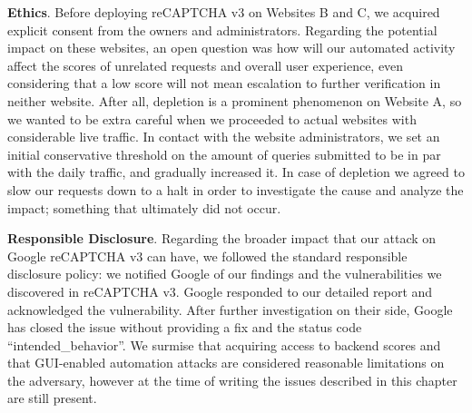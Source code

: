 \textbf{Ethics}.
Before deploying reCAPTCHA v3 on Websites B and C, we acquired explicit consent from the owners and administrators.
Regarding the potential impact on these websites, an open question was how will our automated activity affect the scores of unrelated requests and overall user experience, even considering that a low score will not mean escalation to further verification in neither website.
After all, depletion is a prominent phenomenon on Website A, so we wanted to be extra careful when we proceeded to actual websites with considerable live traffic.
In contact with the website administrators, we set an initial conservative threshold on the amount of queries submitted to be in par with the daily traffic, and gradually increased it.
In case of depletion we agreed to slow our requests down to a halt in order to investigate the cause and analyze the impact; something that ultimately did not occur.


\textbf{Responsible Disclosure}.
Regarding the broader impact that our attack on Google reCAPTCHA v3 can have, we followed the standard responsible disclosure policy: we notified Google of our findings and the vulnerabilities we discovered in reCAPTCHA v3.
Google responded to our detailed report and acknowledged the vulnerability.
After further investigation on their side, Google has closed the issue without providing a fix and the status code ``intended\_behavior''.
We surmise that acquiring access to backend scores and that GUI-enabled automation attacks are considered reasonable limitations on the adversary, however at the time of writing the issues described in this chapter are still present.

